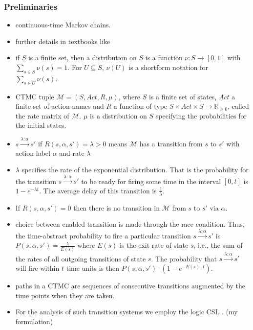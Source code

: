 \documentclass[a4paper, 10pt]{article}
\begin{document}
\subsubsection{Preliminaries}
\label{sssec:analysis-modelchecking-preliminaries}
\begin{itemize}
	\item continuous-time Markov chains.
	\item further details in textbooks like \cite{kul95, ks76}
	\item if $S$ is a finite set, then a distribution on $S$ is a function $\nu:S \rightarrow [0,1]$ with $\sum\limits_{s \in S} \nu (s) = 1$. For $U \subseteq S$, $\nu (U)$ is a shortform notation for $\sum\limits_{s \in U} \nu (s)$.
	\item CTMC tuple $\mathcal{M} = (S, \mathit{Act}, R, \mu)$, where $S$ is a finite set of states, $Act$ a finite set of action names and $R$ a function of type $S \times \mathit{Act} \times S \rightarrow \mathbb{R}_{\ge 0}$, called the rate matrix of $\mathcal{M}$. $\mu$ is a distribution on $S$ specifying the probabilities for the initial states.
	\item $s \xrightarrow{\lambda : \alpha} s'$ if $R(s, \alpha, s') = \lambda > 0$ means $\mathcal{M}$ has a transition from $s$ to $s'$ with action label $\alpha$ and rate $\lambda$
	\item $\lambda$ specifies the rate of the exponential distribution. That is the probability for the transition $s \xrightarrow{\lambda : \alpha} s'$ to be ready for firing some time in the interval $[0,t]$ is $1-e^{- \lambda t}$. The average delay  of this transition is $\frac{1}{\lambda}$.
	\item If $R(s, \alpha, s') = 0$ then there is no transition in $\mathcal{M}$ from $s$ to $s'$ via $\alpha$.
	\item choice between enabled transition is made through the race condition. Thus, the time-abstract probability to fire a particular transition $s \xrightarrow{\lambda : \alpha} s'$ is $P(s, \alpha, s') = \frac{\lambda}{E(s)}$ where $E(s)$ is the exit rate of state $s$, i.e., the sum of the rates of all outgoing transitions of state $s$. The probability that $s \xrightarrow{\lambda : \alpha} s'$ will fire within $t$ time units is then $P(s, \alpha, s') \cdot (1 - e^{- E(s) \cdot t})$.
	\item paths in a CTMC are sequences of consecutive transitions augmented by the time points when they are taken.
	\item For the analysis of such transition systems we employ the logic CSL \cite{assb96, bhhk00, knp07}. (my formulation)

\end{itemize}
\end{document}
